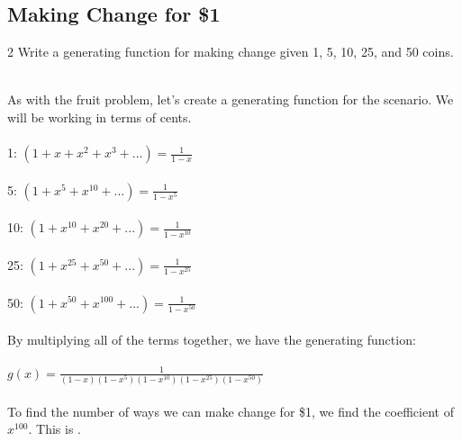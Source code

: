 \documentclass[11pt,twosided]{article}
\begin{document}
\subsection{Making Change for \$1}
\begin{problem}2 Write a generating function for making change given 1\textcent{}, 5\textcent{}, 10\textcent{}, 25\textcent{}, and 50\textcent{} coins. 
\end{problem}
\begin{solution} 
\\As with the fruit problem, let's create a generating function for the scenario. We will be working in terms of cents.\\\\
1\textcent{}: $(1+x+x^2+x^3+...)=\frac{1}{1-x}$ \\\\
5\textcent{}: $(1+x^5+x^10+...)=\frac{1}{1-x^5}$\\\\
10\textcent{}: $(1+x^10+x^20+...)=\frac{1}{1-x^{10}}$\\\\
25\textcent{}: $(1+x^25+x^50+...)=\frac{1}{1-x^{25}}$\\\\
50\textcent{}: $(1+x^50+x^100+...)=\frac{1}{1-x^{50}}$\\\\
By multiplying all of the terms together, we have the generating function: \\\\
$g(x)=\frac{1}{(1-x)(1-x^5)(1-x^{10})(1-x^{25})(1-x^{50})}$ \\\\
To find the number of ways we can make change for \$1, we find the coefficient of $x^{100}$. This is .


\end{solution}
\end{document}
